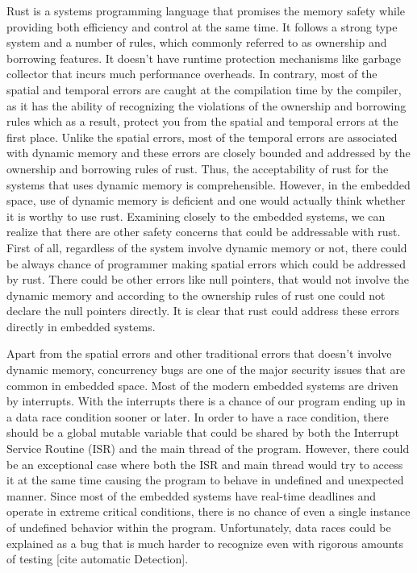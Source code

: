 Rust is a systems programming language that promises the memory safety while providing both efficiency and control at the same time. It follows a strong type system and a number of rules, which commonly referred to as ownership and borrowing features. It doesn't have runtime protection mechanisms like garbage collector that incurs much performance overheads. In contrary, most of the spatial and temporal errors are caught at the compilation time by the compiler, as it has the ability of recognizing the violations of the ownership and borrowing rules which as a result, protect you from the spatial and temporal errors at the first place. Unlike the spatial errors, most of the temporal errors are associated with dynamic memory and these errors are closely bounded and addressed by the ownership and borrowing rules of rust. Thus, the acceptability of rust for the systems that uses dynamic memory is comprehensible.
However, in the embedded space, use of dynamic memory is deficient and one would actually think whether it is worthy to use rust. Examining closely to the embedded systems, we can realize that there are other safety concerns that could be addressable with rust. First of all, regardless of the system involve dynamic memory or not, there could be always chance of programmer making spatial errors which could be addressed by rust. There could be other errors like null pointers, that would not involve the dynamic memory and according to the ownership rules of rust one could not declare the null pointers directly. It is clear that rust could address these errors directly in embedded systems. 

Apart from the spatial errors and other traditional errors that doesn't involve dynamic memory, concurrency bugs are one of the major security issues that are common in embedded space. Most of the modern embedded systems are driven by interrupts. With the interrupts there is a chance of our program ending up in a data race condition sooner or later. In order to have a race condition, there should be a global mutable variable that could be shared by both the Interrupt Service Routine (ISR) and the main thread of the program. However, there could be an exceptional case where both the ISR and main thread would try to access it at the same time causing the program to behave in undefined and unexpected manner. Since most of the embedded systems have real-time deadlines and operate in extreme critical conditions, there is no chance of even a single instance of undefined behavior within the program. Unfortunately, data races could be explained as a bug that is much harder to recognize even with rigorous amounts of testing [cite automatic Detection]. 

